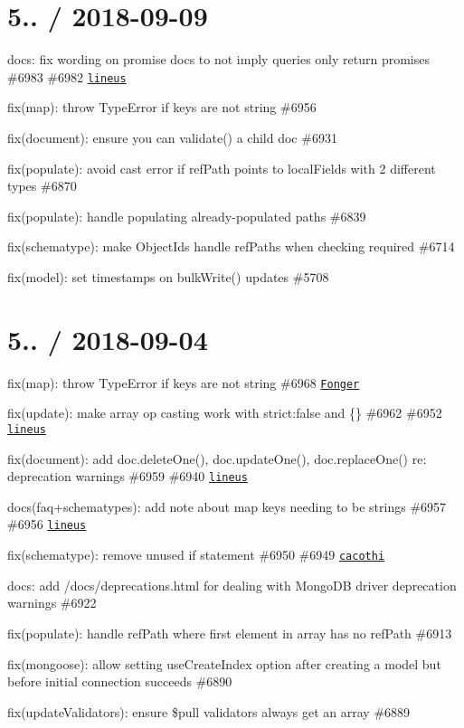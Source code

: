 \section*{5.. / 2018-\/09-\/09 }


\begin{DoxyItemize}
\item docs\+: fix wording on promise docs to not imply queries only return promises \#6983 \#6982 \href{https://github.com/lineus}{\tt lineus}
\item fix(map)\+: throw Type\+Error if keys are not string \#6956
\item fix(document)\+: ensure you can {\ttfamily validate()} a child doc \#6931
\item fix(populate)\+: avoid cast error if ref\+Path points to local\+Fields with 2 different types \#6870
\item fix(populate)\+: handle populating already-\/populated paths \#6839
\item fix(schematype)\+: make Object\+Ids handle ref\+Paths when checking required \#6714
\item fix(model)\+: set timestamps on bulk\+Write() updates \#5708
\end{DoxyItemize}

\section*{5.. / 2018-\/09-\/04 }


\begin{DoxyItemize}
\item fix(map)\+: throw Type\+Error if keys are not string \#6968 \href{https://github.com/Fonger}{\tt Fonger}
\item fix(update)\+: make array op casting work with strict\+:false and \{\} \#6962 \#6952 \href{https://github.com/lineus}{\tt lineus}
\item fix(document)\+: add doc.\+delete\+One(), doc.\+update\+One(), doc.\+replace\+One() re\+: deprecation warnings \#6959 \#6940 \href{https://github.com/lineus}{\tt lineus}
\item docs(faq+schematypes)\+: add note about map keys needing to be strings \#6957 \#6956 \href{https://github.com/lineus}{\tt lineus}
\item fix(schematype)\+: remove unused if statement \#6950 \#6949 \href{https://github.com/cacothi}{\tt cacothi}
\item docs\+: add /docs/deprecations.html for dealing with Mongo\+DB driver deprecation warnings \#6922
\item fix(populate)\+: handle ref\+Path where first element in array has no ref\+Path \#6913
\item fix(mongoose)\+: allow setting use\+Create\+Index option after creating a model but before initial connection succeeds \#6890
\item fix(update\+Validators)\+: ensure \$pull validators always get an array \#6889
\end{DoxyItemize}

